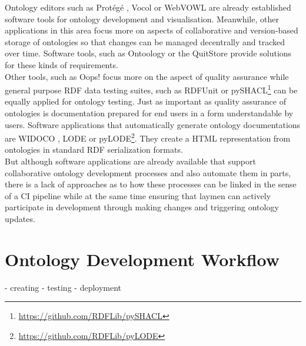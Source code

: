 \documentclass[sigconf]{acmart}
\begin{document}
Ontology editors such as Protégé \cite{protege}, Vocol \cite{halilaj} or WebVOWL \cite{lohmann} are already established software tools for ontology development and visualisation. Meanwhile, other applications in this area focus more on aspects of collaborative and version-based storage of ontologies so that changes can be managed decentrally and tracked over time. Software tools, such as Ontoology \cite{alobaid} or the QuitStore \cite{arndt} provide solutions for these kinds of requirements.\\
Other tools, such as Oops! focus more on the aspect of quality assurance \cite{poveda} while general purpose RDF data testing suites, such as RDFUnit \cite{rdfunit} or pySHACL\footnote{\url{https://github.com/RDFLib/pySHACL}} can be equally applied for ontology testing. Just as important as quality assurance of ontologies is documentation prepared for end users in a form understandable by users. Software applications that automatically generate ontology documentations are WIDOCO \cite{widoco}, LODE \cite{lode} or pyLODE\footnote{\url{https://github.com/RDFLib/pyLODE}}. They create a HTML representation from ontologies in standard RDF serialization formats.\\
But although software applications are already available that support collaborative ontology development processes and also automate them in parts, there is a lack of approaches as to how these processes can be linked in the sense of a CI pipeline while at the same time ensuring that laymen can actively participate in development through making changes and triggering ontology updates.

\section{Ontology Development Workflow}

- creating
- testing
- deployment
\end{document}
